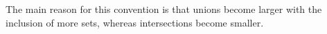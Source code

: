 \documentclass[preview]{standalone}
\begin{document}
\begin{center}
The main reason for this convention is that unions become larger with the inclusion of more sets, whereas intersections become smaller.
\end{center}
\end{document}
